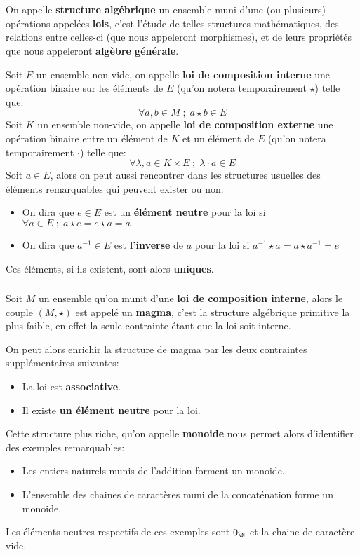 \chapter*{}

On appelle \textbf{structure algébrique} un ensemble muni d'une (ou plusieurs) opérations appelées \textbf{lois}, c'est l'étude de telles structures mathématiques, des relations entre celles-ci (que nous appeleront morphismes), et de leurs propriétés que nous appeleront \textbf{algèbre générale}.\<

Soit \(E\) un ensemble non-vide, on appelle \textbf{loi de composition interne} une opération binaire sur les éléments de \(E\) (qu'on notera temporairement \(\star\)) telle que:
\[ 
   \forall a, b \in M \; ; \; a \star b \in E
\]
Soit \(K\) un ensemble non-vide, on appelle \textbf{loi de composition externe} une opération binaire entre un élément de \(K\) et un élément de \(E\) (qu'on notera temporairement \(\cdot\)) telle que:
\[ 
   \forall \lambda, a \in K \times E \; ; \; \lambda \cdot a \in E
\]
Soit \( a \in E \), alors on peut aussi rencontrer dans les structures usuelles des éléments remarquables qui peuvent exister ou non:
\begin{itemize}
   \item On dira que \( e \in E \) est un \textbf{élément neutre} pour la loi si \( \forall a \in E \; ; \; a \star e = e \star a = a \)
   \item On dira que \( a^{-1} \in E \) est \textbf{l'inverse} de \( a \) pour la loi si \(a^{-1} \star a = a \star a^{-1} = e\)
\end{itemize}
Ces éléments, si ils existent, sont alors \textbf{uniques}.
\subsection*{}
Soit \(M\) un ensemble qu'on munit d'une \textbf{loi de composition interne}, alors le couple \((M, \star)\) est appelé un \textbf{magma}, c'est la structure algébrique primitive la plus faible, en effet la seule contrainte étant que la loi soit interne.\<

On peut alors enrichir la structure de magma par les deux contraintes supplémentaires suivantes:
\begin{itemize}
   \item La loi est \textbf{associative}.
   \item Il existe \textbf{un élément neutre} pour la loi.
\end{itemize}
Cette structure plus riche, qu'on appelle \textbf{monoide} nous permet alors d'identifier des exemples remarquables:
\begin{itemize}[itemsep=0pt]
   \item Les entiers naturels munis de l'addition forment un monoide.
   \item L'ensemble des chaines de caractères muni de la concaténation forme un monoide.
\end{itemize}
Les éléments neutres respectifs de ces exemples sont \(0_\N\) et la chaine de caractère vide.
